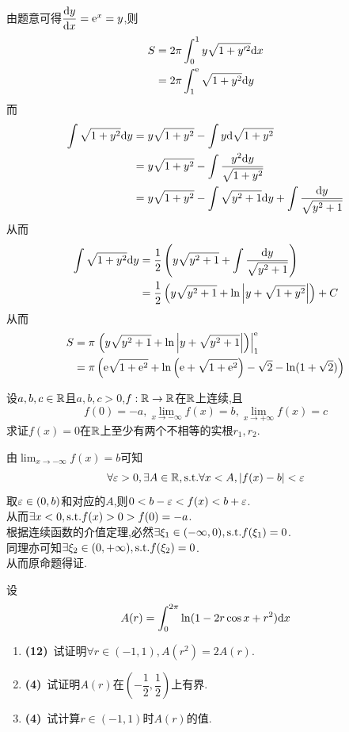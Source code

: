 \documentclass{ctexart}
\begin{document}
\begin{solution}
    由题意可得$\dfrac{\mathrm{d} y}{\mathrm{d} x}=\mathrm{e}^x=y$,则
    \begin{align*}
        S
        &= 2\pi\int_0^1{y\sqrt{1+y'^2}\mathrm{d} x} \\
        &= 2\pi\int_1^{\mathrm{e}}{\sqrt{1+y^2}\mathrm{d} y} \\
    \end{align*}
    而
    \begin{align*}
        \int{\sqrt{1+y^2}}\mathrm{d} y
        &= y\sqrt{1+y^2}-\int y\mathrm{d}\sqrt{1+y^2} \\
        &= y\sqrt{1+y^2}-\int\dfrac{y^2\mathrm{d} y}{\sqrt{1+y^2}} \\
        &= y\sqrt{1+y^2}-\int{\sqrt{y^2+1}\mathrm{d}y}+\int\dfrac{\mathrm{d} y}{\sqrt{y^2+1}}
    \end{align*}
    从而
    \begin{align*}
        \int{\sqrt{1+y^2}}\mathrm{d} y
        &= \dfrac{1}{2}\left(y\sqrt{y^2+1}+\int{\dfrac{\mathrm{d}y}{\sqrt{y^2+1}}}\right) \\
        &= \dfrac{1}{2}\left(y\sqrt{y^2+1}+\ln\left|y+\sqrt{1+y^2}\right|\right)+C
    \end{align*}
    从而
    \begin{align*}
        S
        &= \pi\left.\left(y\sqrt{y^2+1}+\ln\left|y+\sqrt{y^2+1}\right|\right)\right|_1^{\mathrm{e}} \\
        &= \pi\left(\mathrm{e}\sqrt{1+\mathrm{e}^2}+\ln\left(\mathrm{e}+\sqrt{1+\mathrm{e}^2}\right)-\sqrt{2}-\ln(1+\sqrt{2})\right)
    \end{align*}
\end{solution}
\begin{problem}[5.(10\songti{分})]
    设$a,b,c\in\mathbb{R}$且$a,b,c>0$,$f:\mathbb{R}\to\mathbb{R}$在$\mathbb{R}$上连续,且$$f(0)=-a,\lim_{x\to-\infty}f(x)=b,\lim_{x\to+\infty}f(x)=c$$求证$f(x)=0$在$\mathbb{R}$上至少有两个不相等的实根$r_1,r_2$.
\end{problem}
\begin{solution}
    由$\displaystyle\lim_{x\to-\infty}f(x)=b$可知
    $$\forall\varepsilon>0,\exists A\in\mathbb{R},\text{s.t.}\forall x<A,\left|f(x)-b\right|<\varepsilon$$
    取$\varepsilon\in(0,b)$和对应的$A$,则$0<b-\varepsilon<f(x)<b+\varepsilon$.\\
    从而$\exists x<0,\text{s.t.} f(x)>0>f(0)=-a$.\\
    根据连续函数的介值定理,必然$\exists\xi_1\in(-\infty,0),\text{s.t.} f(\xi_1)=0$.\\
    同理亦可知$\exists\xi_2\in(0,+\infty),\text{s.t.} f(\xi_2)=0$.\\
    从而原命题得证.
\end{solution}
\begin{problem}[6.(20\songti{分})]
    设$$A(r)=\int_0^{2\pi}\ln(1-2r\cos x+r^2)\mathrm{d} x$$
    \begin{enumerate}[label=\textbf{(\arabic*)},leftmargin=*]
        \item \textbf{(12)}\ 试证明$\displaystyle\forall r\in(-1,1),A(r^2)=2A(r)$.
        \item \textbf{(4)}\ 试证明$A(r)$在$\left(-\dfrac{1}{2},\dfrac{1}{2}\right)$上有界.
        \item \textbf{(4)}\ 试计算$r\in(-1,1)$时$A(r)$的值.
    \end{enumerate}
\end{problem}
\end{document}
